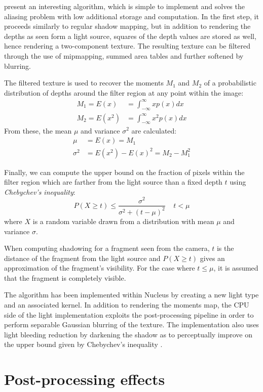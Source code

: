 \citet{Donnelly06varianceshadow} present an interesting algorithm, which is simple to implement and solves the aliasing problem with low additional storage and computation. In the first step, it proceeds similarly to regular shadow mapping, but in addition to rendering the depths as seen form a light source, squares of the depth values are stored as well, hence rendering a two-component texture. The resulting texture can be filtered through the use of mipmapping, summed area tables and further softened by blurring.

The filtered texture is used to recover the moments $M_1$ and $M_2$ of a probabilistic distribution of depths around the filter region at any point within the image:
\begin{align*}
M_1 = E(x) &= \int_{-\infty}^\infty xp(x)dx \\
M_2 = E(x^2) &= \int_{-\infty}^\infty x^2p(x)dx
\end{align*}
From these, the mean $\mu$ and variance $\sigma^2$ are calculated:
\begin{align*}
\mu &= E(x) = M_1\\
\sigma^2 &= E(x^2) - E(x)^2 = M_2 - M_1^2
\end{align*}

Finally, we can compute the upper bound on the fraction of pixels within the filter region which are farther from the light source than a fixed depth $t$ using \emph{Chebychev's inequality}:
\[
P(X \geq t) \leq \frac{\sigma^2}{\sigma^2 + (t - \mu)^2} \;\;\;\; t < \mu
\]
where $X$ is a random variable drawn from a distribution with mean $\mu$ and variance $\sigma$.

When computing shadowing for a fragment seen from the camera, $t$ is the distance of the fragment from the light source and $P(X \geq t)$ gives an approximation of the fragment's visibility. For the case where $t \leq \mu$, it is assumed that the fragment is completely visible.

The algorithm has been implemented within Nucleus by creating a new light type and an associated kernel. In addition to rendering the moments map, the CPU side of the light implementation exploits the post-processing pipeline in order to perform separable Gaussian blurring of the texture. The implementation also uses light bleeding reduction by darkening the shadow as to perceptually improve on the upper bound given by Chebychev's inequality \cite{SATVSM}.

\clearpage
\section{Post-processing effects}

